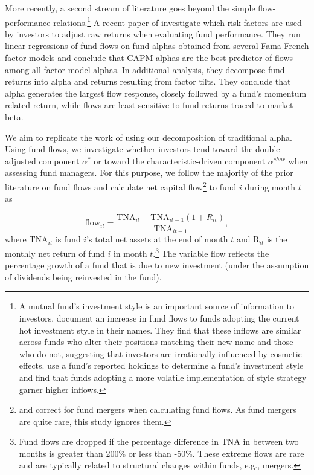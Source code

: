 More recently, a second stream of literature goes beyond the simple flow-performance relations.\footnote{A mutual fund's investment style is an important source of information to investors. \citet{cooper2005changing} document an increase in fund flows to funds adopting the current hot investment style in their names. They find that these inflows are similar across funds who alter their positions matching their new name and those who do not, suggesting that investors are irrationally influenced by cosmetic effects. \citet{guo2016mutual} use a fund's reported holdings to determine a fund's investment style and find that funds adopting a more volatile implementation of style strategy garner higher inflows.} A recent paper of \citet{barber2016factors} investigate which risk factors are used by investors to adjust raw returns when evaluating fund performance. They run linear regressions of fund flows on fund alphas obtained from several Fama-French factor models and conclude that CAPM alphas are the best predictor of flows among all factor model alphas. In additional analysis, they decompose fund returns into alpha and returns resulting from factor tilts. They conclude that alpha generates the largest flow response, closely followed by a fund's momentum related return, while flows are least sensitive to fund returns traced to market beta. 
 
We aim to replicate the work of \citet{barber2016factors} using our decomposition of traditional alpha. Using fund flows, we investigate whether investors tend toward the double-adjusted component $\alpha^*$ or toward the characteristic-driven component $\alpha^{char}$ when assessing fund managers. For this purpose, we follow the majority of the prior literature on fund flows and calculate net capital flow\footnote{\citet{frazzini2008dumb} and \citet{lou2012flow} correct for fund mergers when calculating fund flows. As fund mergers are quite rare, this study ignores them.} to fund $i$ during month $t$ as 
 
  \begin{equation}
\label{flow}
    \text{flow}_{it} = \frac{\text{TNA}_{it} - \text{TNA}_{it-1}  (1+R_{it})}{\text{TNA}_{it-1}},
\end{equation}
where $\text{TNA}_{it}$ is fund $i$'s total net assets at the end of month $t$ and $\text{R}_{it}$ is the monthly net return of fund $i$ in month $t$.\footnote{ Fund flows are dropped if the percentage difference in TNA in between two months is greater than 200\% or less than -50\%. These extreme flows are rare and are typically related to structural changes within funds, e.g., mergers.} The variable flow reflects the percentage growth of a fund that is due to new investment (under the assumption of dividends being reinvested in the fund).

